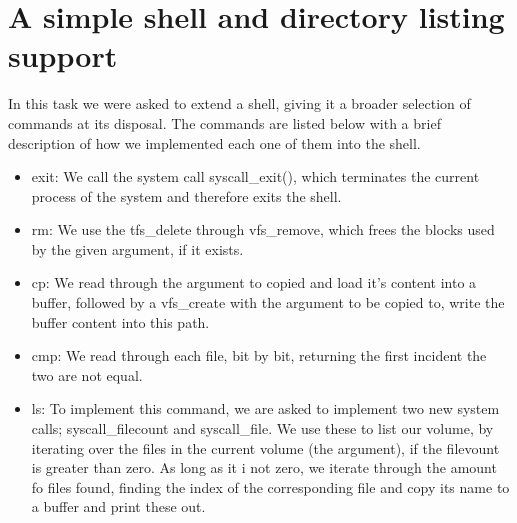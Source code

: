 \documentclass[12pt,a4paper,danish]{article}
\begin{document}
\section{A simple shell and directory listing support}
In this task we were asked to extend a shell, giving it a broader selection of commands at its disposal. The commands are listed below with a brief description of how we implemented each one of them into the shell. 
\begin{itemize}
\item exit: We call the system call syscall\_exit(), which terminates the current process of the system and therefore exits the shell.
\item rm: We use the tfs\_delete through vfs\_remove, which  frees the blocks used by the given argument, if it exists.
\item cp: We read through the argument to copied and load it's content into a buffer, followed by a vfs\_create with the argument to be copied to, write the buffer content into  this path.
\item cmp: We read through each file, bit by bit, returning the first incident the two are not equal.
\item ls: To implement this command, we are asked to implement two new system calls; syscall_filecount and syscall_file. We use these to list our volume, by iterating over the files in the current volume (the argument), if the filevount is greater than zero. As long as it i not zero, we iterate through the amount fo files found, finding the index of the corresponding file and copy its name to a buffer and print these out.
\end{itemize}
\end{document}
